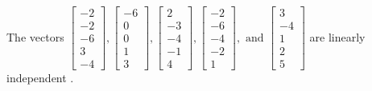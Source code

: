 \begin{exercise}
\begin{exerciseStatement}
  \end{exerciseStatement}
  \begin{exerciseAnswer}
   The vectors \(\left[\begin{array}{r}
-2 \\
-2 \\
-6 \\
3 \\
-4
\end{array}\right] , \left[\begin{array}{r}
-6 \\
0 \\
0 \\
1 \\
3
\end{array}\right] , \left[\begin{array}{r}
2 \\
-3 \\
-4 \\
-1 \\
4
\end{array}\right] , \left[\begin{array}{r}
-2 \\
-6 \\
-4 \\
-2 \\
1
\end{array}\right] , \text{ and } \left[\begin{array}{r}
3 \\
-4 \\
1 \\
2 \\
5
\end{array}\right]\) are 
  	 linearly independent  .
  


  \end{exerciseAnswer}
\end{exercise}